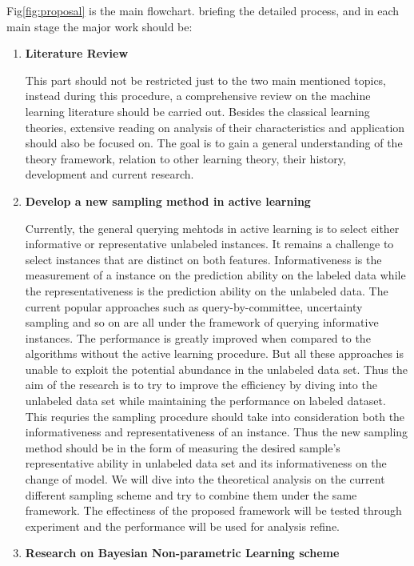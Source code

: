 Fig\ref{fig:proposal} is the main flowchart.  briefing the detailed process, and in each main stage the major work should be:
\begin{enumerate}
 \item \textbf{Literature Review}
 
 This part should not be restricted just to the two main mentioned topics, instead during this procedure, a comprehensive review on the machine learning literature should be carried out. Besides the classical learning theories, extensive reading on analysis of their characteristics and application should also be focused on. The goal is to gain a general understanding of the theory framework, relation to other learning theory,  their history, development and current research. 
 
 \item \textbf{Develop a new sampling method in active learning}
 
 Currently, the general querying mehtods in active learning is to select either informative or representative unlabeled instances\cite{huang2010active}. It remains a challenge to select instances that are distinct on both features\cite{huang2010active}. Informativeness is the measurement of a instance on the prediction ability on the labeled data while the representativeness is the prediction ability on the unlabeled data. The current popular approaches such as query-by-committee\cite{Settles2010}, uncertainty sampling\cite{Settles2010} and so on are all under the framework of querying informative instances. The performance is greatly improved when compared to the algorithms without the active learning procedure. But all these approaches is unable to exploit the potential abundance in the unlabeled data set. Thus the aim of the research is to try to improve the efficiency by diving into the unlabeled data set while maintaining the performance on labeled dataset. This requries the sampling procedure should take into consideration both the informativeness and representativeness of an instance. Thus the new sampling method should be in the form of measuring the desired sample's representative ability in unlabeled data set and its informativeness on the change of model. We will dive into the theoretical analysis on the current different sampling scheme and try to combine them under the same framework. The effectiness of the proposed framework will be tested through experiment and the performance will be used for analysis refine.
 
 \item \textbf{Research on Bayesian Non-parametric Learning scheme}
 

\end{enumerate}
